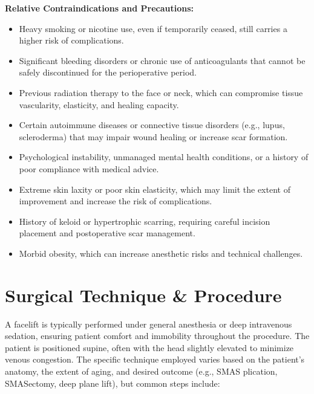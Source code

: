\textbf{Relative Contraindications and Precautions:}
\begin{itemize}
  \item Heavy smoking or nicotine use, even if temporarily ceased, still carries a higher risk of complications.
  \item Significant bleeding disorders or chronic use of anticoagulants that cannot be safely discontinued for the perioperative period.
  \item Previous radiation therapy to the face or neck, which can compromise tissue vascularity, elasticity, and healing capacity.
  \item Certain autoimmune diseases or connective tissue disorders (e.g., lupus, scleroderma) that may impair wound healing or increase scar formation.
  \item Psychological instability, unmanaged mental health conditions, or a history of poor compliance with medical advice.
  \item Extreme skin laxity or poor skin elasticity, which may limit the extent of improvement and increase the risk of complications.
  \item History of keloid or hypertrophic scarring, requiring careful incision placement and postoperative scar management.
  \item Morbid obesity, which can increase anesthetic risks and technical challenges.
\end{itemize}

\section*{Surgical Technique \& Procedure}
A facelift is typically performed under general anesthesia or deep intravenous sedation, ensuring patient comfort and immobility throughout the procedure. The patient is positioned supine, often with the head slightly elevated to minimize venous congestion. The specific technique employed varies based on the patient's anatomy, the extent of aging, and desired outcome (e.g., SMAS plication, SMASectomy, deep plane lift), but common steps include:

